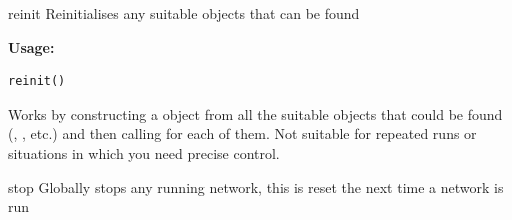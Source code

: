 \documentclass[letterpaper,10pt]{manual}
\begin{document}
\hypertarget{brian.reinit}{}\begin{funcdesc}{reinit}{}
Reinitialises any suitable objects that can be found

\textbf{Usage:}

\begin{Verbatim}[commandchars=@\[\]]
reinit()
\end{Verbatim}

Works by constructing a \hyperlink{brian.MagicNetwork}{} object from all the suitable
objects that could be found (\hyperlink{brian.NeuronGroup}{}, \hyperlink{brian.Connection}{}, etc.) and
then calling  for each of them. Not suitable for repeated
runs or situations in which you need precise control.
\end{funcdesc}


\hypertarget{brian.stop}{}\begin{funcdesc}{stop}{}
Globally stops any running network, this is reset the next time a network is run
\end{funcdesc}
\end{document}
